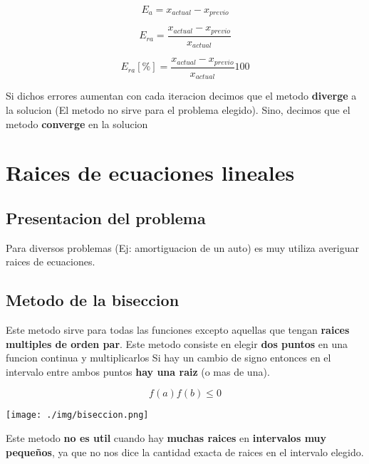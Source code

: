 \documentclass[10pt]{article}
\begin{document}
\begin{equation}
	E_a = x_{actual} - x_{previo}
\end{equation}

\begin{equation}
	E_{ra} = \dfrac{x_{actual} - x_{previo}}{x_{actual}}
\end{equation}

\begin{equation}
	E_{ra}[\%] = \dfrac{x_{actual} - x_{previo}}{x_{actual}}100
\end{equation}

Si dichos errores aumentan con cada iteracion decimos que el metodo 
\textbf{diverge} a la solucion (El metodo no sirve para el problema elegido).
Sino, decimos que el metodo \textbf{converge} en la solucion

\pagebreak

\section{Raices de ecuaciones lineales}

\subsection{Presentacion del problema}

Para diversos problemas (Ej: amortiguacion de un auto) es muy utiliza
averiguar raices de ecuaciones.

\subsection{Metodo de la biseccion}

Este metodo sirve para todas las funciones excepto aquellas que tengan
\textbf{raices multiples de orden par}. Este metodo consiste en elegir 
\textbf{dos puntos} en una funcion continua y multiplicarlos Si hay un 
cambio de signo entonces en el intervalo entre ambos puntos 
\textbf{hay una raiz} (o mas de una).

\begin{equation}
	f(a)f(b) \leq 0
\end{equation}

\texttt{[image: ./img/biseccion.png]}

Este metodo \textbf{no es util} cuando hay \textbf{muchas raices} 
en \textbf{intervalos muy pequeños}, ya que no nos dice la 
cantidad exacta de raices en el intervalo elegido.
\end{document}
